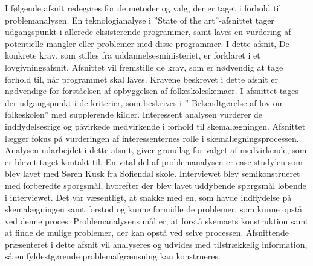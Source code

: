 I følgende afsnit redegøres for de metoder og valg, der er taget i forhold til problemanalysen. En teknologianalyse i ”State of the art”-afsnittet tager udgangspunkt i allerede eksisterende programmer, samt laves en vurdering af potentielle mangler eller problemer med disse programmer. I dette afsnit,
De konkrete krav, som stilles fra uddannelsesministeriet, er forklaret i et lovgivningsafsnit. Afsnittet vil fremstille de krav, som er nødvendig at tage forhold til, når programmet skal laves. Kravene beskrevet i dette afsnit er nødvendige for forståelsen af opbyggelsen af folkeskoleskemaer. I afsnittet tages der udgangspunkt i de kriterier, som beskrives i ” Bekendtgørelse af lov om folkeskolen” med supplerende kilder.
Interessent analysen vurderer de indflydelsesrige og påvirkede medvirkende i forhold til skemalægningen. Afsnittet lægger fokus på vurderingen af interessenternes rolle i skemalægningsprocessen. Analysen udarbejdet i dette afsnit, giver grundlag for valget af medvirkende, som er blevet taget kontakt til.   
En vital del af problemanalysen er case-study’en som blev lavet med Søren Kusk fra Sofiendal skole. Interviewet blev semikonstrueret med forberedte spørgsmål, hvorefter der blev lavet uddybende spørgsmål løbende i interviewet. Det var væsentligt, at snakke med en, som havde indflydelse på skemalægningen samt forstod og kunne formidle de problemer, som kunne opstå ved denne proces.
Problemanalysens mål er, at forstå skemaets konstruktion samt at finde de mulige problemer, der kan opstå ved selve processen. Afsnittende præsenteret i dette afsnit vil analyseres og udvides med tilstrækkelig information, så en fyldestgørende problemafgrænsning kan konstrueres. 

